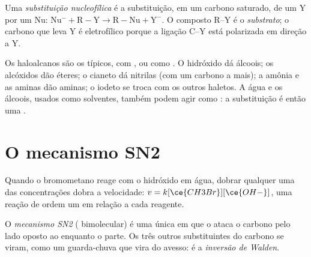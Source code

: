 \begin{definition}\label{def:b1:nucleophilic-substitution:substitution}
Uma \emph{substituição nucleofílica} é a
substituição, em um carbono saturado, de um  Y por um
 Nu: $\mathrm{Nu^-} + \mathrm{R{-}Y} \to \mathrm{R{-}Nu} +
\mathrm{Y^-}$. O composto R--Y é o \emph{substrato}; o
carbono que leva Y é eletrofílico porque a ligação C--Y está polarizada
em direção a Y.
\end{definition}

Os haloalcanos são os  típicos, com ,  ou
 como . O hidróxido dá álcoois; os alcóxidos dão
éteres; o cianeto dá nitrilas (com um carbono a mais); a amônia e as
aminas dão aminas; o iodeto se troca com os outros haletos. A água e os
álcoois, usados como solventes, também podem agir como : a
substituição é então uma .

\section{O mecanismo SN2}

Quando o bromometano reage com o hidróxido em água, dobrar qualquer uma
das concentrações dobra a velocidade: $v = k[\ce{CH3Br}][\ce{OH-}]$, uma
reação de ordem um em relação a cada reagente.

\begin{definition}\label{def:b1:nucleophilic-substitution:sn2}
O \emph{mecanismo SN2} (
bimolecular) é uma única  em que o  ataca o
carbono pelo lado oposto ao  enquanto o 
parte. Os três outros substituintes do carbono se viram, como um
guarda-chuva que vira do avesso: é a \emph{inversão de
Walden}.
\end{definition}

